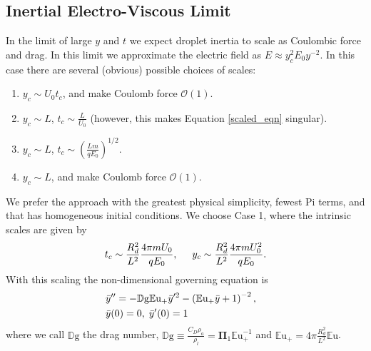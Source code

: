 \documentclass[12pt,a4paper,oneside]{book}
\begin{document}
\subsection{Inertial Electro-Viscous Limit}
In the limit of large $y$ and $t$ we expect droplet inertia to scale as Coulombic force and drag. In this limit we approximate the electric field as $E \approx y_c^2 E_0 y^{-2}$. In this case there are several (obvious) possible choices of scales:
\begin{enumerate}
\item $y_c \sim U_0 t_c$, and make Coulomb force $\mathcal{O}(1)$.
\item $y_c \sim L$, $t_c \sim \frac{L}{U_0}$ (however, this makes Equation \ref{scaled_eqn} singular).
\item $y_c \sim L$, $t_c \sim \left( \frac{L m}{q E_0} \right)^{1/2}$.
\item $y_c \sim L$, and make Coulomb force $\mathcal{O}(1)$.
\end{enumerate}

We prefer the approach with the greatest physical simplicity, fewest Pi terms, and that has homogeneous initial conditions. We choose Case 1, where the intrinsic scales are given by
\[ t_c \sim \frac{R_d^2}{L^2} \frac{4 \pi m U_0}{q E_0}, \hspace{5mm} y_c \sim \frac{R_d^2}{L^2} \frac{4 \pi m U_0^2}{q E_0}.
\]
With this scaling the non-dimensional governing equation is 
\begin{eqnarray}
&\bar{y}'' = - \mathbb{D}\mbox{g} \mathbb{E}\mbox{u}_+ \bar{y}'^2 - \left( \mathbb{E}\mbox{u}_+ \bar{y} + 1 \right)^{-2}, & \nonumber \\
& \bar{y}(0) = 0, \hspace{1 mm} \bar{y}'(0) = 1 & \label{drag_limit}
\end{eqnarray}
where we call $\mathbb{D}\mbox{g}$ the drag number, $\mathbb{D}\mbox{g} \equiv \frac{C_D \rho_a}{\rho_l} = \mathbf{\Pi}_1 {\mathbb{E}\mbox{u}}_+^{-1}$ and $\mathbb{E}\mbox{u}_+ = 4 \pi \frac{R_d^2}{L^2} \mathbb{E}\mbox{u}$.
\end{document}
